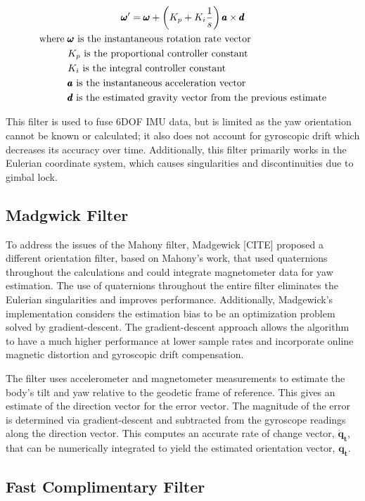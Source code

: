 \begin{gather}
    \label{eq:mahony_filter}
    \pmb{\omega}' = \pmb{\omega} + \left(K_p + K_i\frac{1}{s}\right) \pmb{a} \times \pmb{d} \\
    \begin{aligned}
        \text{where } & \pmb{\omega} \text{ is the instantaneous rotation rate vector} \\
        & K_p \text{ is the proportional controller constant} \\
        & K_i \text{ is the integral controller constant} \\
        & \pmb{a} \text{ is the instantaneous acceleration vector} \\
        & \pmb{d} \text{ is the estimated gravity vector from the previous estimate} \\
    \end{aligned} \notag
\end{gather}

This filter is used to fuse 6DOF IMU data, but is limited as the yaw orientation cannot be known or calculated; it also does not account for gyroscopic drift which decreases its accuracy over time.
Additionally, this filter primarily works in the Eulerian coordinate system, which causes singularities and discontinuities due to gimbal lock.

\subsection{Madgwick Filter} \label{ssec:bkg_madgewick_filter}
To address the issues of the Mahony filter, Madgewick [CITE] proposed a different orientation filter, based on Mahony's work, that used quaternions throughout the calculations and could integrate magnetometer data for yaw estimation.
The use of quaternions throughout the entire filter eliminates the Eulerian singularities and improves performance.
Additionally, Madgewick's implementation considers the estimation bias to be an optimization problem solved by gradient-descent.
The gradient-descent approach allows the algorithm to have a much higher performance at lower sample rates and incorporate online magnetic distortion and gyroscopic drift compensation.

The filter uses accelerometer and magnetometer measurements to estimate the body's tilt and yaw relative to the geodetic frame of reference.
This gives an estimate of the direction vector for the error vector.
The magnitude of the error is determined via gradient-descent and subtracted from the gyroscope readings along the direction vector.
This computes an accurate rate of change vector, $\pmb{\dot{q}_t}$, that can be numerically integrated to yield the estimated orientation vector, $\pmb{q_t}$.

\subsection{Fast Complimentary Filter}